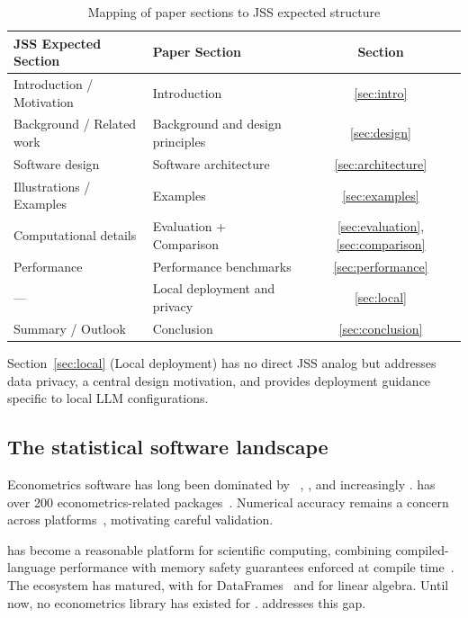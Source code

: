 \begin{table}[htbp]
\centering
\caption{Mapping of paper sections to JSS expected structure}
\label{tab:jss-mapping}
\small
\begin{tabular}{llc}
\toprule
JSS Expected Section & Paper Section & Section \\
\midrule
Introduction / Motivation & Introduction & \ref{sec:intro} \\
Background / Related work & Background and design principles & \ref{sec:design} \\
Software design & Software architecture & \ref{sec:architecture} \\
Illustrations / Examples & Examples & \ref{sec:examples} \\
Computational details & Evaluation + Comparison & \ref{sec:evaluation}, \ref{sec:comparison} \\
Performance & Performance benchmarks & \ref{sec:performance} \\
--- & Local deployment and privacy & \ref{sec:local} \\
Summary / Outlook & Conclusion & \ref{sec:conclusion} \\
\bottomrule
\end{tabular}
\end{table}

\noindent Section~\ref{sec:local} (Local deployment) has no direct JSS analog
but addresses data privacy, a central design motivation, and provides
deployment guidance specific to local LLM configurations.

\subsection{The statistical software landscape}

Econometrics software has long been dominated by
~\citep{R}, , and increasingly .
 has over 200 econometrics-related
packages~\citep{Michelaki+Tsagris:2025}. Numerical accuracy remains a concern
across platforms~\citep{McCullough:1997, McCullough+Vinod:1999}, motivating
careful validation.

 has become a reasonable platform for scientific computing,
combining compiled-language performance with memory safety guarantees enforced
at compile time~\citep{Rust}. The ecosystem has matured, with
 for DataFrames~\citep{polars} and  for linear algebra.
Until now, no econometrics library has existed for .
 addresses this gap.

